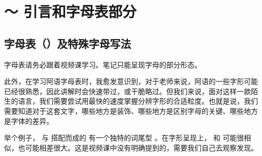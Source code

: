\chapter{ ～ 引言和字母表部分}

\section{字母表（）及特殊字母写法}

\begin{note}
    字母表请务必跟着视频课学习。笔记只能呈现字母的部分形态。

    此外，在学习阿语字母表时，我愈发意识到，对于老师来说，阿语的一些字形可能已经很熟悉，因此讲解时会快速带过，或干脆略过。但我们来说，面对这样一款陌生的语言，我们需要尝试用最快的速度掌握分辨字形的合适粒度。也就是说，我们需要知道对于这套文字，哪些地方是装饰、哪些地方是区别字母的关键、哪些地方是字体的差异。

    举个例子， 与  搭配而成的  有一个独特的词尾型 。在字形呈现上，  和  可能很相似，也可能相差很大。这是视频课中没有明确提到的，需要我们自己去观察发现。
\end{note}

